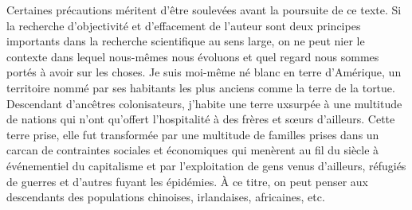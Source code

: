 Certaines précautions méritent d'être soulevées avant la poursuite de ce texte.
Si la recherche d'objectivité et d'effacement de l'auteur sont deux principes
importants dans la recherche scientifique au sens large, on ne peut nier le
contexte dans lequel nous-mêmes nous évoluons et quel regard nous sommes portés
à avoir sur les choses. Je suis moi-même né blanc en terre d'Amérique, un
territoire nommé par ses habitants les plus anciens comme la terre de la tortue.
Descendant d'ancêtres colonisateurs, j'habite une terre uxsurpée à une multitude
de nations qui n'ont qu'offert l'hospitalité à des frères et sœurs d'ailleurs.
Cette terre prise, elle fut transformée par une multitude de familles prises
dans un carcan de contraintes sociales et économiques qui menèrent au fil du
siècle à événementiel du capitalisme et par l'exploitation de gens venus
d'ailleurs, réfugiés de guerres et d'autres fuyant les épidémies. À ce titre, on
peut penser aux descendants des populations chinoises, irlandaises, africaines,
etc.


